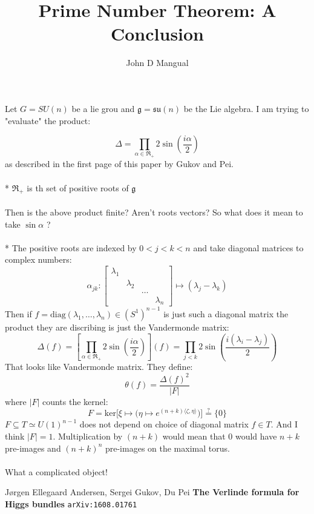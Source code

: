 \documentclass[12pt]{article}
\title{\textbf{ Prime Number Theorem: A Conclusion}}
\author{John D Mangual}
\date{}
\begin{document}
\selectfont \fontsize{25}{30}\selectfont

\maketitle

\noindent Let $G = SU(n)$ be a lie grou and $\mathfrak{g} = \mathfrak{su}(n)$ be the Lie algebra.  I am trying to "evaluate" the product:

$$ \Delta = \prod_{\alpha \in \mathfrak{R}_+} 2 \sin \left( \frac{i\alpha}{2} \right)$$
as described in the first page of this paper by Gukov and Pei.\\ \\
* $\mathfrak{R}_+$ is th set of positive roots of $\mathfrak{g}$ \\ \\
Then is the above product finite?  Aren't roots vectors?  So what does it mean to take $\sin \alpha$ ? \\ \\
* The positive roots are indexed by $0 < j < k < n$ and take diagonal matrices to complex numbers:
$$ \alpha_{jk} : \left[\begin{array}{cccc}
\lambda_1 & & & \\
& \lambda_2 & & \\ 
& & \dots & \\
& & & \lambda_n \end{array}\right] \mapsto (\lambda_j - \lambda_k) $$
Then if $f = \mathrm{diag}(\lambda_1, \dots, \lambda_n) \in (S^1)^{n-1}$ is just such a diagonal matrix the product they are discribing is just the Vandermonde matrix:
$$ \Delta (f)  = \left[\prod_{\alpha \in \mathfrak{R}_+} 2 \sin \left( \frac{i\alpha}{2} \right) \right](f)
= \prod_{j < k} 2 \sin \left( \frac{i(\lambda_i - \lambda_j)}{2} \right)  $$
That looks like Vandermonde matrix.  They define:
$$ \theta(f) = \frac{\Delta (f)^2}{|F|}$$
where $|F|$ counts the kernel:
$$ F = \mathrm{ker}\bigg[ \xi \mapsto \big( \eta \mapsto e^{(n+k)\langle \zeta, \eta \rangle} \big) \bigg] \stackrel{?}{=} \{ 0 \}$$
$F \subseteq T \simeq U(1)^{n-1}$ does not depend on choice of diagonal matrix $f \in T $.  And I think $|F| =1$. \newpage \noindent Multiplication by $(n+k)$ would mean that $0$ would have $n+k$ pre-images and $(n+k)^n$ pre-images on the maximal torus.  \\ \\ What a complicated object!

\newpage

\selectfont \fontsize{12}{10}\selectfont


\begin{thebibliography}{}

\item J{\o}rgen Ellegaard Andersen, Sergei Gukov, Du Pei \textbf{The Verlinde formula for Higgs bundles} \texttt{arXiv:1608.01761}





\end{thebibliography}
\end{document}
